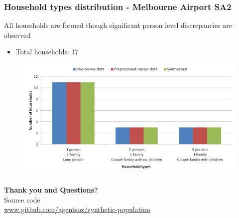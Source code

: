 \begin{frame}
  \frametitle{Household types distribution - Melbourne Airport SA2}
    All households are formed though significant person level discrepancies are 
    observed%
    \begin{itemize}
      \item Total households: 17
    \end{itemize}
\vspace{-2em}
\begin{figure}%
  \includegraphics[trim={0.5cm
    0 0 0},clip,scale=0.5] {images/melb-airport-hh-bar} \newline
\end{figure}%

\end{frame}%

\begin{frame}
  \frametitle{ }
\begin{center}
{\huge \bf \textcolor{rmitred}{Thank you and Questions?}}\\
\vspace{4em}
  Source code\\ \url{www.github.com/agentsoz/synthetic-population}
\end{center}
  
  

  
  
\end{frame}%






